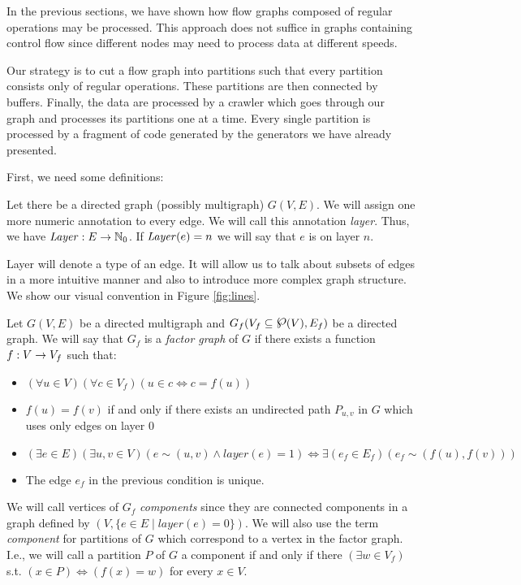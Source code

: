 
\label{sec:partitioning}

In the previous sections, we have shown how flow graphs composed of regular operations may be processed. This approach does not suffice in graphs containing control flow since different nodes may need to process data at different speeds. 

Our strategy is to cut a flow graph into partitions such that every partition consists only of regular operations. These partitions are then connected by buffers. Finally, the data are processed by a crawler which  goes through our graph and processes its partitions one at a time. Every single partition is processed by a fragment of code generated by the generators we have already presented. 

First, we need some definitions:

  Let there be a directed graph (possibly multigraph) $G(V,E)$. We will assign one more numeric annotation to every edge. We will call this annotation \emph{layer}. Thus, we have $\mf{layer}: E \arrow \N_0$. If $\mf{layer}(e) = n$ we will say that $e$ is on layer $n$. 
\myenddef

Layer will denote a type of an edge. It will allow us to talk about subsets of edges in a more intuitive manner and also to introduce more complex graph structure. We show our visual convention in Figure \ref{fig:lines}.


  Let $G(V,E)$ be a directed multigraph and $G_f(V_f \subseteq \powerset(V),E_f)$ be a directed graph. We will say that $G_f$ is a \emph{factor graph} of $G$ if there exists a function $f: V \rightarrow V_f$ such that:
  \begin{itemize}
    \item $(\forall u \in V)(\forall c \in V_f)( u \in c \Longleftrightarrow c = f(u)) $
    \item $f(u) = f(v)$ if and only if there exists an undirected path $P_{u,v}$ in $G$ which uses only edges on layer 0
    \item $(\exists e \in E)(\exists u,v \in V)(e \sim (u,v) \land layer(e) = 1) \Longleftrightarrow \exists(e_f \in E_f)( e_f \sim (f(u), f(v)) )$  
    \item The edge $e_f$ in the previous condition is unique.
  \end{itemize}
  We will call vertices of $G_f$ \emph{components} since they are connected components in a graph defined by $(V, \{e \in E \mid layer(e) = 0 \})$. We will also use the term \emph{component} for partitions of $G$ which correspond to a vertex in the factor graph. I.e., we will call a partition $P$ of $G$ a component if and only if there $(\exists w \in V_f)$ s.t. $(x \in P) \Longleftrightarrow ( f(x) = w)$ for every $x \in V$.
\myenddef

